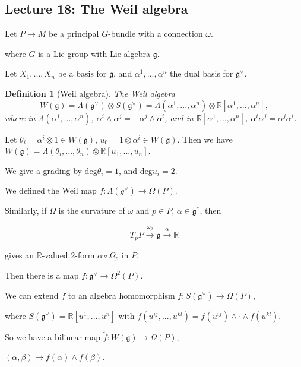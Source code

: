 \documentclass{article}
\theoremstyle{mystyle}
\newtheorem*{definition}{Definition}%
\theoremstyle{remark}
\numberwithin{equation}{section}
\begin{document}
\subsection{Lecture 18: The Weil algebra}

Let $P\rightarrow M$ be a principal $G$-bundle with a connection $\omega$.

where $G$ is a Lie group with Lie algebra $\mathfrak{g}$.

Let $X_1,...,X_n$ be a basis for $\mathfrak{g}$, and $\alpha^1,...,\alpha^n$ the dual basis for $\mathfrak{g}^\vee$.


\begin{definition}[Weil algebra]

The \emph{Weil algebra} 
$$W(\mathfrak{g}) = \Lambda(\mathfrak{g}^\vee)\otimes S(\mathfrak{g}^\vee)
=
\Lambda(\alpha^1,...,\alpha^n)\otimes \mathbb{R}[\alpha^1,...,\alpha^n],$$
where in $\Lambda(\alpha^1,...,\alpha^n)$, $\alpha^i\wedge \alpha^j = - \alpha^j \wedge \alpha^i$, and in $\mathbb{R}[\alpha^1,...,\alpha^n]$, $\alpha^i\alpha^j = \alpha^j\alpha^i$.
\end{definition}


Let $\theta_i = \alpha^i\otimes 1 \in W(\mathfrak{g})$, $u_0 = 1\otimes \alpha^i \in W(\mathfrak{g})$. Then we have
$W(\mathfrak{g}) = \Lambda(\theta_i,...,\theta_n) \otimes \mathbb{R}[u_1,...,u_n]$.

We give a grading by $\mathrm{deg}\theta_i=1$, and $\mathrm{deg}u_i = 2$. 

We defined the Weil map $f\colon \Lambda(g^\vee)\rightarrow \Omega(P)$.

Similarly, if $\Omega$ is the curvature of $\omega$ and $p\in P$, $\alpha \in \mathfrak{g}^*$, then

$$T_pP\xrightarrow{\omega_p}\mathfrak{g}\xrightarrow{\alpha} \mathbb{R}$$

gives an $\mathbb{R}$-valued 2-form $\alpha\circ \Omega_p$ in $P$.

Then there is a map $f\colon \mathfrak{g}^\vee\rightarrow \Omega^2(P)$.

We can extend $f$ to an algebra homomorphism $f\colon S(\mathfrak{g}^\vee)
\rightarrow \Omega(P)$,

where $S(\mathfrak{g}^\vee) = \mathbb{R}[u^1,...,u^n]$ with $f(u^{ij},...,u^{kl})
= f(u^{ij})\wedge \cdot \wedge f(u^{kl})$. 

So we have a bilinear map $\widetilde{f}\colon W(\mathfrak{g}) \rightarrow \Omega(P)$,

$(\alpha,\beta)\mapsto f(\alpha)\wedge f(\beta)$. 
\end{document}
